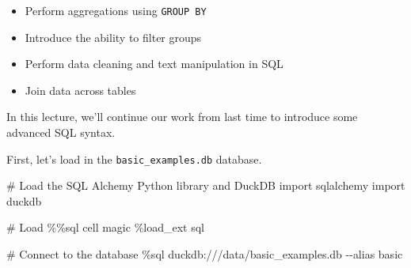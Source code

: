 \documentclass[
  letterpaper,
  DIV=11,
  numbers=noendperiod]{scrreprt}
\newenvironment{Shaded}{\begin{snugshade}}{\end{snugshade}}
\newcommand{\CommentTok}[1]{\textcolor[rgb]{0.37,0.37,0.37}{#1}}
\newcommand{\ImportTok}[1]{\textcolor[rgb]{0.00,0.46,0.62}{#1}}
\newcommand{\NormalTok}[1]{\textcolor[rgb]{0.00,0.23,0.31}{#1}}
\newcommand{\OperatorTok}[1]{\textcolor[rgb]{0.37,0.37,0.37}{#1}}
\providecommand{\tightlist}{%
  \setlength{\itemsep}{0pt}\setlength{\parskip}{0pt}}\usepackage{longtable,booktabs,array}
\begin{document}
\begin{tcolorbox}[enhanced jigsaw, arc=.35mm, left=2mm, toprule=.15mm, leftrule=.75mm, bottomrule=.15mm, colframe=quarto-callout-note-color-frame, rightrule=.15mm, colbacktitle=quarto-callout-note-color!10!white, opacitybacktitle=0.6, coltitle=black, bottomtitle=1mm, colback=white, toptitle=1mm, title=\textcolor{quarto-callout-note-color}{\faInfo}\hspace{0.5em}{Learning Outcomes}, breakable, opacityback=0, titlerule=0mm]

\begin{itemize}
\tightlist
\item
  Perform aggregations using \texttt{GROUP\ BY}
\item
  Introduce the ability to filter groups
\item
  Perform data cleaning and text manipulation in SQL
\item
  Join data across tables
\end{itemize}

\end{tcolorbox}

In this lecture, we'll continue our work from last time to introduce
some advanced SQL syntax.

First, let's load in the \texttt{basic\_examples.db} database.

\begin{Shaded}
\begin{Highlighting}[]
\CommentTok{\# Load the SQL Alchemy Python library and DuckDB}
\ImportTok{import}\NormalTok{ sqlalchemy}
\ImportTok{import}\NormalTok{ duckdb}
\end{Highlighting}
\end{Shaded}

\begin{Shaded}
\begin{Highlighting}[]
\CommentTok{\# Load \%\%sql cell magic}
\OperatorTok{\%}\NormalTok{load\_ext sql}
\end{Highlighting}
\end{Shaded}

\begin{Shaded}
\begin{Highlighting}[]
\CommentTok{\# Connect to the database}
\OperatorTok{\%}\NormalTok{sql duckdb:}\OperatorTok{///}\NormalTok{data}\OperatorTok{/}\NormalTok{basic\_examples.db }\OperatorTok{{-}{-}}\NormalTok{alias basic}
\end{Highlighting}
\end{Shaded}
\end{document}
